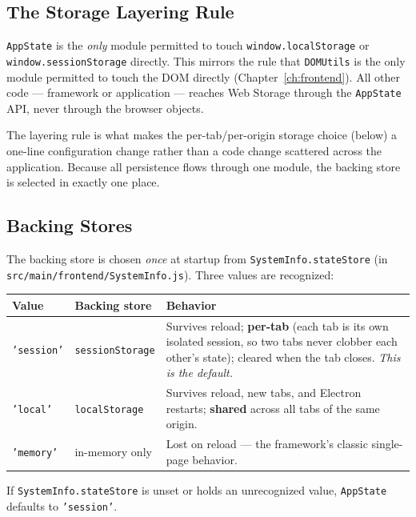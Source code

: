 \subsection{The Storage Layering Rule}
\label{sec:rs-appstate-layering}

\texttt{AppState} is the \emph{only} module permitted to touch \texttt{window.localStorage} or \texttt{window.sessionStorage} directly.  This mirrors the rule that \texttt{DOMUtils} is the only module permitted to touch the DOM directly (Chapter~\ref{ch:frontend}).  All other code --- framework or application --- reaches Web Storage through the \texttt{AppState} API, never through the browser objects.

\begin{notebox}
The layering rule is what makes the per-tab/per-origin storage choice (below) a one-line configuration change rather than a code change scattered across the application.  Because all persistence flows through one module, the backing store is selected in exactly one place.
\end{notebox}

\subsection{Backing Stores}
\label{sec:rs-appstate-backends}

The backing store is chosen \emph{once} at startup from \texttt{SystemInfo.stateStore} (in \texttt{src/main/frontend/SystemInfo.js}).  Three values are recognized:

\begin{longtable}{P{0.17\textwidth}P{0.27\textwidth}P{0.44\textwidth}}
\toprule
\textbf{Value} & \textbf{Backing store} & \textbf{Behavior} \\
\midrule
\endhead
\texttt{'session'} & \texttt{sessionStorage} & Survives reload; \textbf{per-tab} (each tab is its own isolated session, so two tabs never clobber each other's state); cleared when the tab closes.  \emph{This is the default.} \\
\texttt{'local'} & \texttt{localStorage} & Survives reload, new tabs, and Electron restarts; \textbf{shared} across all tabs of the same origin. \\
\texttt{'memory'} & in-memory only & Lost on reload --- the framework's classic single-page behavior. \\
\bottomrule
\end{longtable}

\noindent
If \texttt{SystemInfo.stateStore} is unset or holds an unrecognized value, \texttt{AppState} defaults to \texttt{'session'}.

